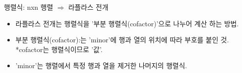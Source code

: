 \documentclass[aspectratio=169]{beamer}
\begin{document}
\begin{frame}{행렬식: nxn 행렬 $\Rightarrow$ 라플라스 전개}
  \begin{itemize}
    \begin{block}{라플라스 전개}
      \begin{align*}
        |A| & = a_{11}\cdot |C_{11}| + a_{12}\cdot |C_{12}| + \cdots +a_{1n}\cdot |C_{1n}| \\
            & = a_{11}\cdot |C_{11}| + a_{21}\cdot |C_{21}| + \cdots +a_{m1}\cdot |C_{m1}|, \\
        \text{cofactor}: & |C_{ij}| = (-1)^{i+j} |M_{ij}| ,\quad i:\text{행, } j:\text{열}
      \end{align*}
    \end{block}
    \item 라플라스 전개는 행렬식을 '부분 행렬식(cofactor)'으로 나누어 계산 하는 방법.
    \item 부분 행렬식(cofactor):는 'minor'에 행과 열의 위치에 따라 부호를 붙인 것. *cofactor는 행렬식이므로 '값'.
    \item 'minor'는 행렬에서 특정 행과 열을 제거한 나머지의 행렬식.
  \end{itemize}
\end{frame}
\end{document}
